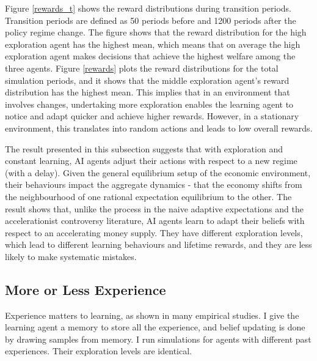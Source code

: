 \documentclass[hidelinks]{article}
\begin{document}
Figure \ref{rewards_t} shows the reward distributions during transition periods. Transition periods are defined as 50 periods before and 1200 periods after the policy regime change. The figure shows that the reward distribution for the high exploration agent has the highest mean, which means that on average the high exploration agent makes decisions that achieve the highest welfare among the three agents. Figure \ref{rewards} plots the reward distributions for the total simulation periods, and it shows that the middle exploration agent's reward distribution has the highest mean. This implies that in an environment that involves changes, undertaking more exploration enables the learning agent to notice and adapt quicker and achieve higher rewards. However, in a stationary environment, this translates into random actions and leads to low overall rewards. 

The result presented in this subsection suggests that with exploration and constant learning, AI agents adjust their actions with respect to a new regime (with a delay). Given the general equilibrium setup of the economic environment, their behaviours impact the aggregate dynamics - that the economy shifts from the neighbourhood of one rational expectation equilibrium to the other. The result shows that, unlike the process in the naive adaptive expectations and the accelerationist controversy literature, AI agents learn to adapt their beliefs with respect to an accelerating money supply. They have different exploration levels, which lead to different learning behaviours and lifetime rewards, and they are less likely to make systematic mistakes.


\subsection{More or Less Experience}
Experience matters to learning, as shown in many empirical studies. I give the learning agent a memory to store all the experience, and belief updating is done by drawing samples from memory. I run simulations for agents with different past experiences. Their exploration levels are identical. 
\end{document}
